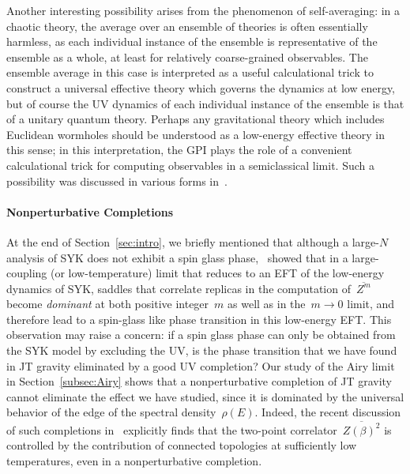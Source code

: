 \documentclass[12pt]{article}
\begin{document}
Another interesting possibility arises from the phenomenon of self-averaging: in a chaotic theory, the average over an ensemble of theories is often essentially harmless, as each individual instance of the ensemble is representative of the ensemble as a whole, at least for relatively coarse-grained observables.  The ensemble average in this case is interpreted as a useful calculational trick to construct a universal effective theory which governs the dynamics at low energy, but of course the UV dynamics of each individual instance of the ensemble is that of a unitary quantum theory.  Perhaps any gravitational theory which includes Euclidean wormholes should be understood as a low-energy effective theory in this sense; in this interpretation, the GPI plays the role of a convenient calculational trick for computing observables in a semiclassical limit.  Such a possibility was discussed in various forms in~\cite{PenShe19,BeldeB20,PolRoz20}.


\paragraph{Nonperturbative Completions}  At the end of Section~\ref{sec:intro}, we briefly mentioned that although a large-$N$ analysis of SYK does not exhibit a spin glass phase,~\cite{AreKhr18} showed that in a large-coupling (or low-temperature) limit that reduces to an EFT of the low-energy dynamics of SYK, saddles that correlate replicas in the computation of~$\overline{Z^m}$ become \textit{dominant} at both positive integer~$m$ as well as in the~$m \to 0$ limit, and therefore lead to a spin-glass like phase transition in this low-energy EFT.  This observation may raise a concern: if a spin glass phase can only be obtained from the SYK model by excluding the UV, is the phase transition that we have found in JT gravity eliminated by a good UV completion?  Our study of the Airy limit in Section~\ref{subsec:Airy} shows that a nonperturbative completion of JT gravity cannot eliminate the effect we have studied, since it is dominated by the universal behavior of the edge of the spectral density~$\rho(E)$.  Indeed, the recent discussion of such completions in~\cite{Joh20} explicitly finds that the two-point correlator~$\overline{Z(\beta)^{2}}$ is controlled by the contribution of connected topologies at sufficiently low temperatures, even in a nonperturbative completion.
\end{document}
